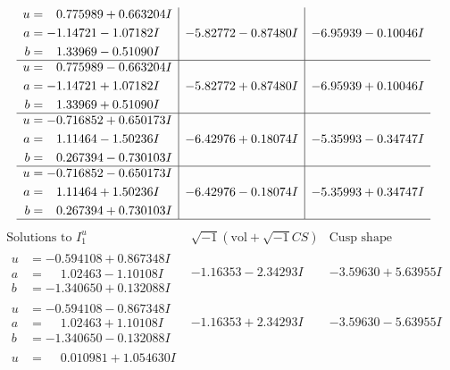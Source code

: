 \documentclass[1p]{elsarticle_modified}
\theoremstyle{definition}
\newcommand{\I}{\sqrt{-1}}
\begin{document}
$$\begin{array}{c|c|c}
\begin{aligned}
u &= \phantom{-}0.775989 + 0.663204 I \\
a &= -1.14721 - 1.07182 I \\
b &= \phantom{-}1.33969 - 0.51090 I\end{aligned}
 & -5.82772 - 0.87480 I & -6.95939 - 0.10046 I \\ \hline\begin{aligned}
u &= \phantom{-}0.775989 - 0.663204 I \\
a &= -1.14721 + 1.07182 I \\
b &= \phantom{-}1.33969 + 0.51090 I\end{aligned}
 & -5.82772 + 0.87480 I & -6.95939 + 0.10046 I \\ \hline\begin{aligned}
u &= -0.716852 + 0.650173 I \\
a &= \phantom{-}1.11464 - 1.50236 I \\
b &= \phantom{-}0.267394 - 0.730103 I\end{aligned}
 & -6.42976 + 0.18074 I & -5.35993 - 0.34747 I \\ \hline\begin{aligned}
u &= -0.716852 - 0.650173 I \\
a &= \phantom{-}1.11464 + 1.50236 I \\
b &= \phantom{-}0.267394 + 0.730103 I\end{aligned}
 & -6.42976 - 0.18074 I & -5.35993 + 0.34747 I\\
 \hline 
 \end{array}$$\newpage$$\begin{array}{c|c|c}  
\text{Solutions to }I^u_{1}& \I (\text{vol} + \sqrt{-1}CS) & \text{Cusp shape}\\
 \hline 
\begin{aligned}
u &= -0.594108 + 0.867348 I \\
a &= \phantom{-}1.02463 - 1.10108 I \\
b &= -1.340650 + 0.132088 I\end{aligned}
 & -1.16353 - 2.34293 I & -3.59630 + 5.63955 I \\ \hline\begin{aligned}
u &= -0.594108 - 0.867348 I \\
a &= \phantom{-}1.02463 + 1.10108 I \\
b &= -1.340650 - 0.132088 I\end{aligned}
 & -1.16353 + 2.34293 I & -3.59630 - 5.63955 I \\ \hline\begin{aligned}
u &= \phantom{-}0.010981 + 1.054630 I \\

\end{aligned}
\end{array}$$
\end{document}
